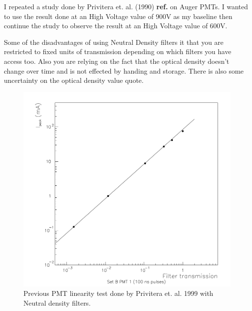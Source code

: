 I repeated a study done by Privitera et. al. (1990) \textbf{ref.} on Auger PMTs. I wanted to use the result done at an High Voltage value of 900V as my baseline then continue the study to observe the result at an High Voltage value of 600V.

Some of the disadvantages of using Neutral Density filters it that you are restricted to fixed units of transmission depending on which filters you have access too. Also you are relying on the fact that the optical density doesn't change over time and is not effected by handing and storage. There is also some uncertainty on the optical density value quote.

\begin{figure}
\centering
\includegraphics[width=\textwidth]{chapters/graphs/PMTchar/pmt_linearity_100V_privitera.png}
\caption{Previous PMT linearity test done by Privitera et. al. 1999 with Neutral density filters.}
\end{figure}

